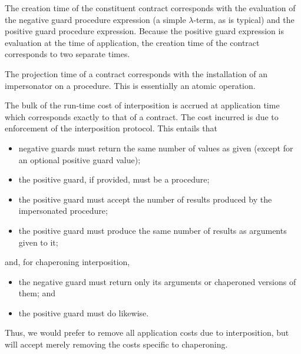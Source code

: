 The creation time of the constituent contract corresponds with the evaluation of the negative guard procedure expression (a simple $\lambda$-term, as is typical) and the positive guard procedure expression.
Because the positive guard expression is evaluation at the time of application, the creation time of the contract corresponds to two separate times.

The projection time of a contract corresponds with the installation of an impersonator on a procedure.
This is essentially an atomic operation.

The bulk of the run-time cost of interposition is accrued at application time which corresponds exactly to that of a contract.
The cost incurred is due to enforcement of the interposition protocol.
This entails that
\begin{itemize}
\item negative guards must return the same number of values as given (except for an optional positive guard value);
\item the positive guard, if provided, must be a procedure;
\item the positive guard must accept the number of results produced by the impersonated procedure;
\item the positive guard must produce the same number of results as arguments given to it;
\end{itemize}
and, for chaperoning interposition,
\begin{itemize}
\item the negative guard must return only its arguments or chaperoned versions of them; and
\item the positive guard must do likewise.
\end{itemize}

Thus, we would prefer to remove all application costs due to interposition, but will accept merely removing the costs specific to chaperoning.